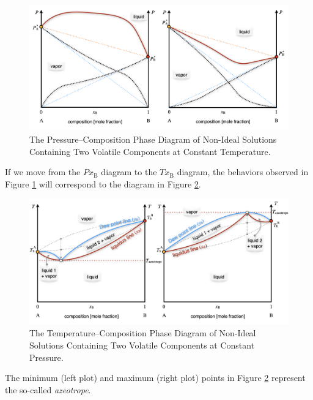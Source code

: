 \documentclass[
  9pt,
]{extbook}
\theoremstyle{definition}
\theoremstyle{definition}
\theoremstyle{definition}
\theoremstyle{definition}
\theoremstyle{remark}
\begin{document}
\begin{figure}

{\centering \includegraphics[width=0.8\linewidth]{./img/OEP_Figures.025} 

}

\caption{The Pressure–Composition Phase Diagram of Non-Ideal Solutions Containing Two Volatile Components at Constant Temperature.}\label{fig:FigMC7}
\end{figure}

If we move from the \(Px_{\text{B}}\) diagram to the \(Tx_{\text{B}}\) diagram, the behaviors observed in Figure \ref{fig:FigMC7} will correspond to the diagram in Figure \ref{fig:FigMC8}.

\begin{figure}

{\centering \includegraphics[width=0.8\linewidth]{./img/OEP_Figures.026} 

}

\caption{The Temperature–Composition Phase Diagram of Non-Ideal Solutions Containing Two Volatile Components at Constant Pressure.}\label{fig:FigMC8}
\end{figure}

The minimum (left plot) and maximum (right plot) points in Figure \ref{fig:FigMC8} represent the so-called \emph{azeotrope}.
\end{document}
